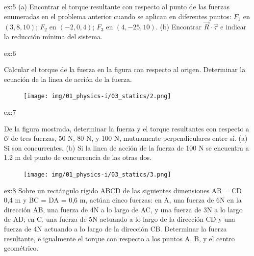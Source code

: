 \begin{multicols}{2}
      \begin{excercise}[][][$(a)\tau=13000\ \mathrm{lbf\cdot ft}$, $(b)\tau_{min}=347\ \mathrm{lbf\cdot ft}$]{ex:5}{
          (a) Encontrar el torque resultante con respecto al punto de las fuerzas enumeradas en el problema anterior cuando se aplican en diferentes puntos: $F_1$ en $(3, 8, 10)$; $F_2$ en $(-2, 0, 4)$; $F_3$ en $(4, -25, 10)$. (b) Encontrar $\vec{R}\cdot\vec{\tau}$ e indicar la reducción mínima del sistema.
          }
      \end{excercise}
      \begin{excercise}[][][$\tau= 24\sqrt{5}\ \mathrm{Nm}$, $y=0.5x+5$]{ex:6}{
         Calcular el torque de la fuerza en la figura con respecto al origen. Determinar la ecuación de la linea de acción de la fuerza. 
         \begin{figure}[H]
             \centering
             \texttt{[image: img/01\_physics-i/03\_statics/2.png]}
         \end{figure}
         }
     \end{excercise} 
     \begin{excercise}[][][$(a)R=137.2\ \mathrm{N}$, $ \tau=0$, $(b)\ R=187.2\ \mathrm{N}$, $\tau=120\ \mathrm{Nm}$]{ex:7}{
         De la figura mostrada, determinar la fuerza y el torque resultantes con respecto a $\mathcal{O}$ de tres fuerzas, 50 N, 80 N, y 100 N, mutuamente perpendiculares entre sí. (a) Si son concurrentes. (b) Si la linea de acción de la fuerza de 100 N se encuentra a 1.2 m del punto de concurrencia de las otras dos.
         \begin{figure}[H]
             \centering
             \texttt{[image: img/01\_physics-i/03\_statics/3.png]}
         \end{figure}
         }
     \end{excercise}
     \begin{excercise}[][][$(a)\ R=3.975 \ \mathrm{N}$, $(b)\ \tau_{A}=1.4 \ \mathrm{Nm}$, $(c)\ \tau_{B}=5.33 \ \mathrm{Nm}$, $(d)\ \tau_{O}=1.5 \ \mathrm{Nm}$]{ex:8}{
         Sobre un rectángulo rígido ABCD de las siguientes dimensiones AB = CD 0,4 m y BC = DA = 0,6 m, actúan cinco fuerzas: en A, una fuerza de 6N en la dirección AB, una fuerza de 4N a lo largo de AC, y una fuerza de 3N a lo largo de AD; en C, una fuerza de 5N actuando a lo largo de la dirección CD y una fuerza de 4N actuando a lo largo de la dirección CB. Determinar la fuerza resultante, e igualmente el torque con respecto a los puntos A, B, y el centro geométrico.        
         }
     \end{excercise}


\end{multicols}
